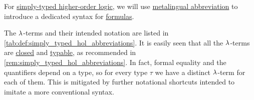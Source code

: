 \begin{definition}\label{def:simply_typed_hol_abbreviations}
  For \hyperref[def:simply_typed_hol]{simply-typed higher-order logic}, we will use \hyperref[con:metalingual_abbreviation]{metalingual abbreviation} to introduce a dedicated syntax for \hyperref[def:simply_typed_hol_formula]{formulas}.

  The \( {\mathrm \lambda} \)-terms and their intended notation are listed in \cref{tab:def:simply_typed_hol_abbreviations}. It is easily seen that all the \( {\mathrm \lambda} \)-terms are \hyperref[def:lambda_combinator]{closed} and \hyperref[def:typability]{typable}, as recommended in \cref{rem:simply_typed_hol_abbreviations}. In fact, formal equality and the quantifiers depend on a type, so for every type \( \tau \) we have a distinct \( {\mathrm \lambda} \)-term for each of them. This is mitigated by further notational shortcuts intended to imitate a more conventional syntax.


\end{definition}
